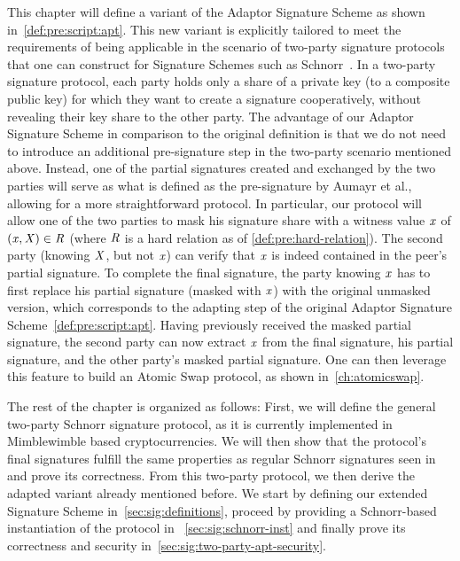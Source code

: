 This chapter will define a variant of the Adaptor Signature Scheme as shown in~\cref{def:pre:script:apt}.
This new variant is explicitly tailored to meet the requirements of being applicable in the scenario of two-party signature protocols that one can construct for Signature Schemes such as Schnorr~\cite{maxwell2019simple}.
In a two-party signature protocol, each party holds only a share of a private key (to a composite public key) for which they want to create a signature cooperatively, without revealing their key share to the other party.
The advantage of our Adaptor Signature Scheme in comparison to the original definition is that we do not need to introduce an additional pre-signature step in the two-party scenario mentioned above.
Instead, one of the partial signatures created and exchanged by the two parties will serve as what is defined as the pre-signature by Aumayr et al., allowing for a more straightforward protocol.
In particular, our protocol will allow one of the two parties to mask his signature share with a witness value $\mathit{x}$ of $(\mathit{x}, \mathit{X}) \in \mathit{R}$ (where $\mathit{R}$ is a hard relation as of \cref{def:pre:hard-relation}).
The second party (knowing $\mathit{X}$, but not $\mathit{x}$) can verify that $\mathit{x}$ is indeed contained in the peer's partial signature.
To complete the final signature, the party knowing $\mathit{x}$ has to first replace his partial signature (masked with $\mathit{x}$) with the original unmasked version, which corresponds to the adapting step of the original Adaptor Signature Scheme~\cref{def:pre:script:apt}.
Having previously received the masked partial signature, the second party can now extract $\mathit{x}$ from the final signature, his partial signature, and the other party's masked partial signature.
One can then leverage this feature to build an Atomic Swap protocol, as shown in~\cref{ch:atomicswap}.

The rest of the chapter is organized as follows:
First, we will define the general two-party Schnorr signature protocol, as it is currently implemented in Mimblewimble based cryptocurrencies.
We will then show that the protocol's final signatures fulfill the same properties as regular Schnorr signatures seen in~\cite{schnorr1989efficient} and prove its correctness.
From this two-party protocol, we then derive the adapted variant already mentioned before.
We start by defining our extended Signature Scheme in~\cref{sec:sig:definitions}, proceed by providing a Schnorr-based instantiation of the protocol in ~\cref{sec:sig:schnorr-inst} and finally prove its correctness and security in~\cref{sec:sig:two-party-apt-security}.

